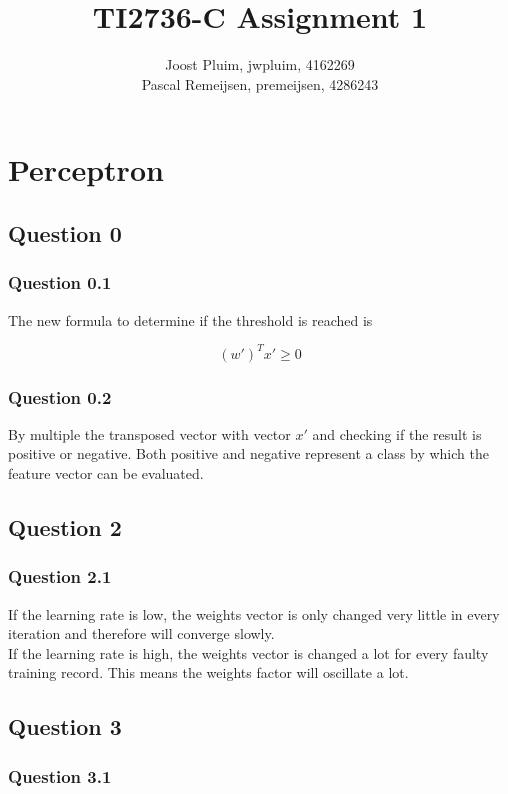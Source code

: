 \documentclass[11pt,twoside,a4paper]{article}
\title{TI2736-C Assignment 1}
\author{
	Joost Pluim, jwpluim, 4162269 \\
	Pascal Remeijsen, premeijsen, 4286243
}
\begin{document}
\maketitle
\clearpage

\chapter{Perceptron}

\section{Question 0}
	
	\subsection{Question 0.1}
	The new formula to determine if the threshold is reached is
	
	\begin{equation}
		(w')^T x' \geq 0
	\end{equation}
	
	\subsection{Question 0.2}
	By multiple the transposed vector with vector $x'$ and checking if the result is positive or negative. Both positive and negative represent a class by which the feature vector can be evaluated. 
				
\section{Question 2}

	\subsection{Question 2.1}
	If the learning rate is low, the weights vector is only changed very little in every iteration and therefore will converge slowly.\\
	If the learning rate is high, the weights vector is changed a lot for every faulty training record. This means the weights factor will oscillate a lot. 
	
\section{Question 3}

	\subsection{Question 3.1}
	
\end{document}
